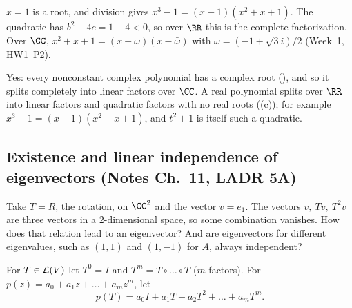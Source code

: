 \documentclass[10pt]{scrartcl}
\begin{document}
\begin{example*}
  $x=1$ is a root, and division gives $x^3-1=(x-1)(x^2+x+1)$. The quadratic has $b^2-4c=1-4<0$, so over $\RR$ this is the complete factorization. Over $\CC$, $x^2+x+1=(x-\omega)(x-\bar\omega)$ with $\omega=(-1+\sqrt3i)/2$ (Week~1, HW1~P2).
\end{example*}

\revisit Yes: every nonconstant complex polynomial has a complex root (), and so it splits completely into linear factors over $\CC$. A real polynomial splits over $\RR$ into linear factors and quadratic factors with no real roots ((c)); for example $x^3-1=(x-1)(x^2+x+1)$, and $t^2+1$ is itself such a quadratic.

\subsection{Existence and linear independence of eigenvectors (Notes Ch.~11, LADR 5A)}

\begin{qbox}
  Take $T=R$, the rotation, on $\CC^2$ and the vector $v=e_1$. The vectors $v,\ Tv,\ T^2v$ are three vectors in a $2$-dimensional space, so some combination vanishes. How does that relation lead to an eigenvector? And are eigenvectors for different eigenvalues, such as $(1,1)$ and $(1,-1)$ for $A$, always independent?
\end{qbox}

\begin{definition*}
  For $T\in\mathcal L(V)$ let $T^0=I$ and $T^m=T\circ\dots\circ T$ ($m$ factors). For $p(z)=a_0+a_1z+\dots+a_mz^m$, let
  \[
    p(T) = a_0I + a_1T + a_2T^2 + \dots + a_mT^m.
  \]
\end{definition*}
\end{document}
